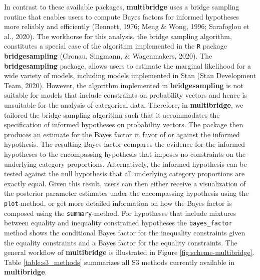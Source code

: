 \documentclass[
  english,
  man,floatsintext]{apa6}
\begin{document}
In contrast to these available packages, \textbf{multibridge} uses a bridge sampling routine that enables users to compute Bayes factors for informed hypotheses more reliably and efficiently (Bennett, 1976; Meng \& Wong, 1996; Sarafoglou et al., 2020). The workhorse for this analysis, the bridge sampling algorithm, constitutes a special case of the algorithm implemented in the \texttt{R} package \textbf{bridgesampling} (Gronau, Singmann, \& Wagenmakers, 2020). The \textbf{bridgesampling} package, allows users to estimate the marginal likelihood for a wide variety of models, including models implemented in Stan (Stan Development Team, 2020). However, the algorithm implemented in \textbf{bridgesampling} is not suitable for models that include constraints on probability vectors and hence is unsuitable for the analysis of categorical data. Therefore, in \textbf{multibridge}, we tailored the bridge sampling algorithm such that it accommodates the specification of informed hypotheses on probability vectors. The package then produces an estimate for the Bayes factor in favor of or against the informed hypothesis. The resulting Bayes factor compares the evidence for the informed hypotheses to the encompassing hypothesis that imposes no constraints on the underlying category proportions. Alternatively, the informed hypothesis can be tested against the null hypothesis that all underlying category proportions are exactly equal. Given this result, users can then either receive a visualization of the posterior parameter estimates under the encompassing hypothesis using the \texttt{plot}-method, or get more detailed information on how the Bayes factor is composed using the \texttt{summary}-method. For hypotheses that include mixtures between equality and inequality constrained hypotheses the \texttt{bayes\_factor} method shows the conditional Bayes factor for the inequality constraints given the equality constraints and a Bayes factor for the equality constraints. The general workflow of \textbf{multibridge} is illustrated in Figure \ref{fig:scheme-multibridge}. Table \ref{table:s3_methods} summarizes all S3 methods currently available in \textbf{multibridge}.
\end{document}
